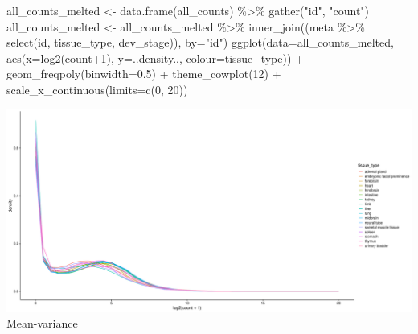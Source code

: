 \documentclass[
]{article}
\newenvironment{Shaded}{\begin{snugshade}}{\end{snugshade}}
\newcommand{\AttributeTok}[1]{\textcolor[rgb]{0.77,0.63,0.00}{#1}}
\newcommand{\DecValTok}[1]{\textcolor[rgb]{0.00,0.00,0.81}{#1}}
\newcommand{\FloatTok}[1]{\textcolor[rgb]{0.00,0.00,0.81}{#1}}
\newcommand{\FunctionTok}[1]{\textcolor[rgb]{0.00,0.00,0.00}{#1}}
\newcommand{\NormalTok}[1]{#1}
\newcommand{\OtherTok}[1]{\textcolor[rgb]{0.56,0.35,0.01}{#1}}
\newcommand{\SpecialCharTok}[1]{\textcolor[rgb]{0.00,0.00,0.00}{#1}}
\newcommand{\StringTok}[1]{\textcolor[rgb]{0.31,0.60,0.02}{#1}}
\begin{document}
\begin{Shaded}
\begin{Highlighting}[]
\NormalTok{all\_counts\_melted }\OtherTok{\textless{}{-}} \FunctionTok{data.frame}\NormalTok{(all\_counts) }\SpecialCharTok{\%\textgreater{}\%} \FunctionTok{gather}\NormalTok{(}\StringTok{"id"}\NormalTok{, }\StringTok{"count"}\NormalTok{)}
\NormalTok{all\_counts\_melted }\OtherTok{\textless{}{-}}\NormalTok{ all\_counts\_melted }\SpecialCharTok{\%\textgreater{}\%} \FunctionTok{inner\_join}\NormalTok{((meta }\SpecialCharTok{\%\textgreater{}\%} \FunctionTok{select}\NormalTok{(id, tissue\_type, dev\_stage)), }\AttributeTok{by=}\StringTok{"id"}\NormalTok{)}
  \FunctionTok{ggplot}\NormalTok{(}\AttributeTok{data=}\NormalTok{all\_counts\_melted, }\FunctionTok{aes}\NormalTok{(}\AttributeTok{x=}\FunctionTok{log2}\NormalTok{(count}\SpecialCharTok{+}\DecValTok{1}\NormalTok{), }\AttributeTok{y=}\NormalTok{..density.., }\AttributeTok{colour=}\NormalTok{tissue\_type)) }\SpecialCharTok{+} \FunctionTok{geom\_freqpoly}\NormalTok{(}\AttributeTok{binwidth=}\FloatTok{0.5}\NormalTok{) }\SpecialCharTok{+} \FunctionTok{theme\_cowplot}\NormalTok{(}\DecValTok{12}\NormalTok{) }\SpecialCharTok{+} \FunctionTok{scale\_x\_continuous}\NormalTok{(}\AttributeTok{limits=}\FunctionTok{c}\NormalTok{(}\DecValTok{0}\NormalTok{, }\DecValTok{20}\NormalTok{))}
\end{Highlighting}
\end{Shaded}

\includegraphics{Exploration_files/figure-latex/unnamed-chunk-14-1.pdf}
Mean-variance
\end{document}
